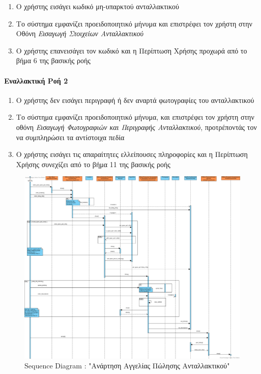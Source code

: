 \documentclass{../ol-softwaremanual}
\begin{document}
	\begin{enumerate}
		\item Ο χρήστης εισάγει κωδικό μη-υπαρκτού ανταλλακτικού
		\item Το σύστημα εμφανίζει προειδοποιητικό μήνυμα και επιστρέφει τον χρήστη στην Οθόνη \textit{Εισαγωγή Στοιχείων Ανταλλακτικού}
		\item Ο χρήστης επανεισάγει τον κωδικό και η Περίπτωση Χρήσης προχωρά από το βήμα 6 της βασικής ροής
	\end{enumerate}
	
	\paragraph{Εναλλακτική Ροή 2}
	
	\begin{enumerate}
		\item Ο χρήστης δεν εισάγει περιγραφή ή δεν αναρτά φωτογραφίες του ανταλλακτικού
		\item Το σύστημα εμφανίζει προειδοποιητικό μήνυμα, και επιστρέφει τον χρήστη στην οθόνη \textit{Εισαγωγή Φωτογραφιών και Περιγραφής Ανταλλακτικού}, προτρέποντάς τον να συμπληρώσει τα αντίστοιχα πεδία
		\item Ο χρήστης εισάγει τις απαραίτητες ελλείπουσες πληροφορίες και η Περίπτωση Χρήσης συνεχίζει από το βήμα 11 της βασικής ροής
	\end{enumerate}
	
	\begin{figure}[htbp!]
		\centering
		\includegraphics[scale=0.23]{img/seq_spare_part_listing.png}
		\caption{\en Sequence Diagram : "\gr Ανάρτηση Αγγελίας Πώλησης Ανταλλακτικού\en"\gr}
	\end{figure}
	
\end{document}
